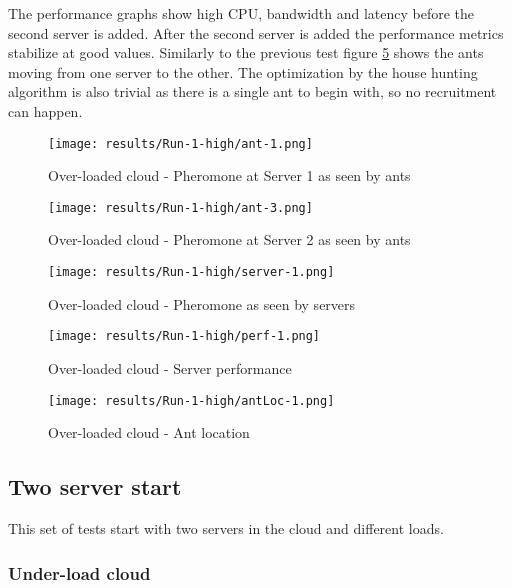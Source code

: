The performance graphs show high CPU, bandwidth and latency before the second server is added. After the second server is added the performance metrics stabilize at good values. Similarly to the previous test figure \ref{fig:1serv-antloc-high} shows the ants moving from one server to the other. The optimization by the house hunting algorithm is also trivial as there is a single ant to begin with, so no recruitment can happen.

\begin{figure}[!ht]
	\centering
		\texttt{[image: results/Run-1-high/ant-1.png]}
	\caption{Over-loaded cloud - Pheromone at Server 1 as seen by ants}
	\label{fig:1serv-ant1-high}
\end{figure}

\begin{figure}
	\centering
		\texttt{[image: results/Run-1-high/ant-3.png]}
	\caption{Over-loaded cloud - Pheromone at Server 2 as seen by ants}
	\label{fig:1serv-ant3-high}
\end{figure}

\begin{figure}
	\centering
		\texttt{[image: results/Run-1-high/server-1.png]}
	\caption{Over-loaded cloud - Pheromone as seen by servers}
	\label{fig:1serv-pher-high}
\end{figure}

\begin{figure}
	\centering
		\texttt{[image: results/Run-1-high/perf-1.png]}
	\caption{Over-loaded cloud - Server performance}
	\label{fig:1serv-perf-high}
\end{figure}

\begin{figure}
	\centering
		\texttt{[image: results/Run-1-high/antLoc-1.png]}
	\caption{Over-loaded cloud - Ant location}
	\label{fig:1serv-antloc-high}
\end{figure}

\subsection{Two server start}

This set of tests start with two servers in the cloud and different loads.

\subsubsection{Under-load cloud}


